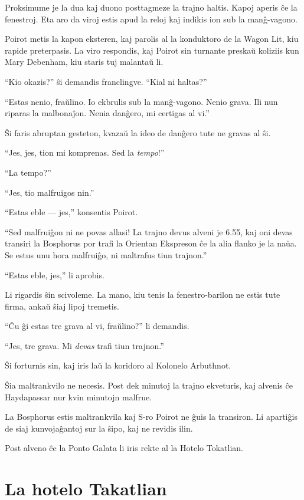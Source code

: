 Proksimume je la dua kaj duono posttagmeze la trajno haltis. Kapoj aperis ĉe la fenestroj. Eta aro da viroj estis apud la reloj kaj indikis ion sub la manĝ-vagono.

Poirot metis la kapon eksteren, kaj parolis al la konduktoro de la Wagon Lit, kiu rapide preterpasis. La viro respondis, kaj Poirot sin turnante preskaŭ koliziis kun Mary Debenham, kiu staris tuj malantaŭ li.

``Kio okazis?'' ŝi demandis franclingve. ``Kial ni haltas?''

``Estas nenio, fraŭlino. Io ekbrulis sub la manĝ-vagono. Nenio grava. Ili nun riparas la malbonaĵon. Nenia danĝero, mi certigas al vi.''

Ŝi faris abruptan gesteton, kvazaŭ la ideo de danĝero tute ne gravas al ŝi.

``Jes, jes, tion mi komprenas. Sed la \emph{tempo}!''

``La tempo?''

``Jes, tio malfruigos nin.''

``Estas eble --- jes,'' konsentis Poirot.

``Sed malfruiĝon ni ne povas allasi! La trajno devus alveni je 6.55, kaj oni devas transiri la Bosphorus por trafi la Orientan Ekspreson ĉe la alia flanko je la naŭa. Se estus unu hora malfruiĝo, ni maltrafus tiun trajnon.''

``Estas eble, jes,'' li aprobis.

Li rigardis ŝin scivoleme. La mano, kiu tenis la fenestro-barilon ne estis tute firma, ankaŭ ŝiaj lipoj tremetis.

``Ĉu ĝi estas tre grava al vi, fraŭlino?'' li demandis.

``Jes, tre grava. Mi \emph{devas} trafi tiun trajnon.''

Ŝi forturnis sin, kaj iris laŭ la koridoro al Kolonelo Arbuthnot.

Ŝia maltrankvilo ne necesis. Post dek minutoj la trajno ekveturis, kaj alvenis ĉe Haydapassar nur kvin minutojn malfrue.

La Bosphorus estis maltrankvila kaj S-ro Poirot ne ĝuis la transiron. Li apartiĝis de siaj kunvojaĝantoj sur la ŝipo, kaj ne revidis ilin.

Post alveno ĉe la Ponto Galata li iris rekte al la Hotelo Tokatlian.

\chapter[La hotelo Takatlian]{La hotelo Takatlian}


